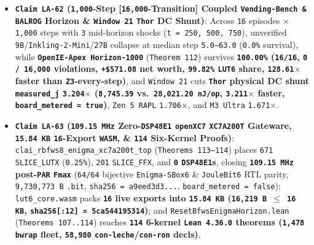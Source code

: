 \documentclass[10pt]{article}
\begin{document}
\begin{itemize}
  \item \textbf{\texttt{Claim LA-62} (\texttt{1,000}-Step [\texttt{16,000}-Transition] Coupled \texttt{Vending-Bench \& BALROG} Horizon \& \texttt{Window 21} \texttt{Thor} DC Shunt)}: Across \texttt{16} episodes $\times$ \texttt{1,000} steps with \texttt{3} mid-horizon shocks (\texttt{t = 250, 500, 750}), unverified \texttt{9B}/\texttt{Inkling-2-Mini}/\texttt{27B} collapse at median step \texttt{5.0--63.0} (\texttt{0.0\%} survival), while \textbf{\texttt{OpenIE-Apex Horizon-1000}} (\texttt{Theorem 112}) survives \textbf{\texttt{100.00\%} (\texttt{16/16}, \texttt{0 / 16,000} violations, \texttt{+\$571.08} net worth, \texttt{99.82\%} \texttt{LUT6} share, \texttt{128.61$\times$} faster than \texttt{Z3}-every-step)}, and \texttt{Window 21} cuts \textbf{\texttt{Thor} physical DC shunt \texttt{measured\_j} \texttt{3.204$\times$} (\texttt{8,745.39} vs.\ \texttt{28,021.20 nJ/op}, \texttt{3.211$\times$} faster, \texttt{board\_metered = true})}, \texttt{Zen 5 RAPL} \texttt{1.706$\times$}, and \texttt{M3 Ultra} \texttt{1.671$\times$}.
  \item \textbf{\texttt{Claim LA-63} (\texttt{109.15 MHz} Zero-\texttt{DSP48E1} \texttt{openXC7} \texttt{XC7A200T} Gateware, \texttt{15.84 KB} \texttt{16}-Export \texttt{WASM}, \& \texttt{114} Six-Kernel Proofs)}: \texttt{clai\_rbfws8\_enigma\_xc7a200t\_top} (\texttt{Theorems 113--114}) places \texttt{671} \texttt{SLICE\_LUTX} (\texttt{0.25\%}), \texttt{201} \texttt{SLICE\_FFX}, and \textbf{\texttt{0} \texttt{DSP48E1}s}, closing \textbf{\texttt{109.15 MHz} post-\texttt{PAR} \texttt{Fmax}} (\texttt{64/64} bijective \texttt{Enigma-SBox6} \& \texttt{JouleBit6} RTL parity, \texttt{9,730,773 B} \texttt{.bit}, \texttt{sha256 = a9eed3d3...}, \texttt{board\_metered = false}); \texttt{lut6\_core.wasm} packs \textbf{\texttt{16} live exports into \texttt{15.84 KB} (\texttt{16,219 B $\le$ 16 KB}, \texttt{sha256[:12] = 5ca544195314})}; and \texttt{ResetBfwsEnigmaHorizon.lean} (\texttt{Theorems 107..114}) reaches \textbf{\texttt{114} 6-kernel \texttt{Lean 4.36.0} theorems (\texttt{1,478} \texttt{bwrap} fleet, \texttt{58,980} \texttt{con-leche}/\texttt{con-ron} decls)}.
\end{itemize}
\end{document}
